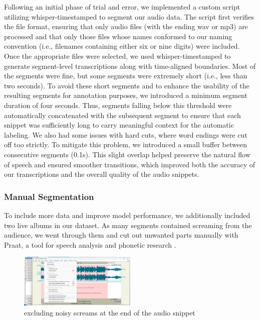 \documentclass[a4paper]{article}
\begin{document}
	Following an initial phase of trial and error, we implemented a custom script utilizing whisper-timestamped to segment our audio data. The script first verifies the file format, ensuring that only audio files (with the ending wav or mp3) are processed and that only those files whose names conformed to our naming convention (i.e., filenames containing either six or nine digits) were included. Once the appropriate files were selected, we used whisper-timestamped to generate segment-level transcriptions along with time-aligned boundaries. Most of the segments were fine, but some segments were extremely short (i.e., less than two seconds). To avoid these short segments and to enhance the usability of the resulting segments for annotation purposes, we introduced a minimum segment duration of four seconds. Thus, segments falling below this threshold were automatically concatenated with the subsequent segment to ensure that each snippet was sufficiently long to carry meaningful context for the automatic labeling. We also had some issues with hard cuts, where word endings were cut off too strictly. To mitigate this problem, we introduced a small buffer between consecutive segments (0.1s). This slight overlap helped preserve the natural flow of speech and ensured smoother transitions, which improved both the accuracy of our transcriptions and the overall quality of the audio snippets.
	
	
	\subsubsection{Manual Segmentation}
	
	To include more data and improve model performance, we additionally included two live albums in our dataset. As many segments contained screaming from the audience, we went through them and cut out unwanted parts manually with Praat, a tool for speech analysis and phonetic research \cite{BoersmaND}.
	
	
	\begin{figure}[htbp]
		\centering
		\includegraphics[width=0.5\textwidth]{graphics/cutting_noise.png}
		\caption{excluding noisy screams at the end of the audio snippet}
		\label{fig:bild1}
	\end{figure}
	
\end{document}
